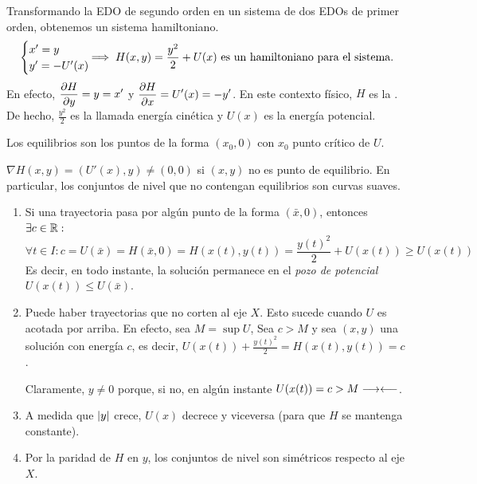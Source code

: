 \begin{obs}
	Transformando la EDO de segundo orden en un sistema de dos EDOs de primer orden, obtenemos un sistema hamiltoniano.
	\[\begin{cases}
			x' = y \\
			y' = -U'(x)
		\end{cases} \hspace{-0.5cm} \implies H(x, y) = \frac{y^2}{2} + U(x)\tex{ es un hamiltoniano para el sistema.}\]
	En efecto, $\displaystyle \pdv{H}{y} = y = x'$ y $\displaystyle \pdv{H}{x} = U'(x) = -y'$. En este contexto físico, $H$ es la . \\
	De hecho, $\frac{y^2}{2}$ es la llamada energía cinética y $U(x)$ es la energía potencial.

	Los equilibrios son los puntos de la forma $(x_0, 0)$ con $x_0$ punto crítico de $U$.
\end{obs}

\begin{obs}
	$\nabla H (x, y) = (U'(x), y) \neq (0, 0)$ si $(x, y)$ no es punto de equilibrio. En particular, los conjuntos de nivel que no contengan equilibrios son curvas suaves.
\end{obs}


\begin{enumerate}
	\item Si una trayectoria pasa por algún punto de la forma $(\bar{x}, 0)$, entonces $\exists c \in \mathbb{R} :$
	      \[\forall t \in I : c = U(\bar{x}) = H(\bar{x}, 0) = H(x(t), y(t)) = \frac{y(t)^2}{2} + U(x(t)) \geq U(x(t))\]
	      Es decir, en todo instante, la solución permanece en el \textit{pozo de potencial} $U(x(t)) \leq U(\bar{x})$.
	\item Puede haber trayectorias que no corten al eje $X$. Esto sucede cuando $U$ es acotada por arriba. En efecto, sea $M = \sup U$, Sea $c> M $ y sea $(x, y)$ una solución con energía $c$, es decir, $U(x(t)) + \frac{y(t)^2}{2} = H(x(t), y(t)) = c$.

	      Claramente, $y\neq 0$ porque, si no, en algún instante $U(x(t)) = c > M \longrightarrow\longleftarrow$.

	\item A medida que $\left|y\right|$ crece, $U(x)$ decrece y viceversa (para que $H$ se mantenga constante).

	\item Por la paridad de $H$ en $y$, los conjuntos de nivel son simétricos respecto al eje $X$.
\end{enumerate}

